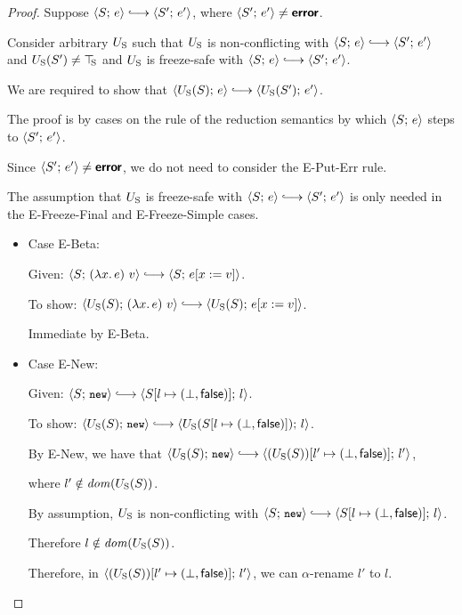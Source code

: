 \begin{proof}
  Suppose $\config{S}{e} \parstepsto \config{S'}{e'}$, where
  $\langle S';\, e' \rangle \neq \textbf{\textsf{error}}$.

  Consider arbitrary $U_{\mathrm{S}}$ such that $U_{\mathrm{S}}$ is non-conflicting with
  $\config{S}{e} \parstepsto \config{S'}{e'}$ and $U_{\mathrm{S}}(S') \neq \top\hspace{-0.85mm}_{\mathrm{S}}$
  and $U_{\mathrm{S}}$ is freeze-safe with $\config{S}{e} \parstepsto
  \config{S'}{e'}$.

  We are required to show that $\config{\Ustore(S)}{e} \parstepsto
  \config{\Ustore(S')}{e'}$.

  The proof is by cases on the rule of the reduction semantics by
  which $\langle S;\, e \rangle$ steps to $\langle S';\, e' \rangle$.

  Since $\langle S';\, e' \rangle \neq \textbf{\textsf{error}}$, we do not need to consider the
  {\sc E-Put-Err} rule.

  The assumption that $U_{\mathrm{S}}$ is freeze-safe with $\config{S}{e}
  \parstepsto \config{S'}{e'}$ is only needed in the {\sc
    E-Freeze-Final} and {\sc E-Freeze-Simple} cases.

  \begin{itemize}

  \item Case {\sc E-Beta}:

    Given: $\config{S}{\app{(\lam{x}{e})}{v}} \parstepsto
    \config{S}{\subst{e}{x}{v}}$.

    To show: $\config{\Ustore(S)}{\app{(\lam{x}{e})}{v}} \parstepsto
    \config{\Ustore(S)}{\subst{e}{x}{v}}$.

    Immediate by {\sc E-Beta}.

  \item Case {\sc E-New}:

    Given: $\config{S}{\NEW} \parstepsto
    \config{\extS{S}{l}{\bot}{\frozenfalse}}{l}$.

    To show: $\config{\Ustore(S)}{\NEW} \parstepsto
    \config{\Ustore(\extS{S}{l}{\bot}{\frozenfalse})}{l}$.

    By {\sc E-New}, we have that $\config{\Ustore(S)}{\NEW} \parstepsto
    \config{\extS{(\Ustore(S))}{l'}{\bot}{\frozenfalse}}{l'}$,

    where $l' \notin \mathit{dom}(U_{\mathrm{S}}(S))$.

    By assumption, $U_{\mathrm{S}}$ is non-conflicting with $\config{S}{\NEW}
    \parstepsto \config{\extS{S}{l}{\bot}{\frozenfalse}}{l}$.

    Therefore $l \notin \mathit{dom}(U_{\mathrm{S}}(S))$.

    Therefore, in
    $\langle (U_{\mathrm{S}}(S))[l' \mapsto (\bot, \textsf{false})];\, l' \rangle$, we can
    $\alpha$-rename $l'$ to $l$.


\end{itemize}
\end{proof}
